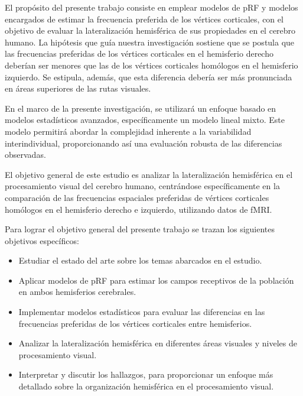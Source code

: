 El propósito del presente trabajo consiste en emplear modelos de pRF y modelos encargados de estimar la frecuencia preferida de los v\'ertices corticales, con el objetivo de evaluar la lateralización hemisférica de sus propiedades en el cerebro humano. La hipótesis que guía nuestra investigación sostiene que se postula que las frecuencias preferidas de los v\'ertices corticales en el hemisferio derecho deberían ser menores que las de los v\'ertices corticales homólogos en el hemisferio izquierdo. Se estipula, además, que esta diferencia debería ser más pronunciada en áreas superiores de las rutas  visuales.


En el marco de la presente investigación, se utilizará un enfoque basado en modelos estadísticos avanzados, específicamente un modelo lineal mixto. Este modelo permitirá abordar la complejidad inherente a la variabilidad interindividual, proporcionando así una evaluación robusta de las diferencias observadas.


El objetivo general de este estudio es analizar la lateralización hemisférica en el procesamiento visual del cerebro humano, centrándose específicamente en la comparación de las frecuencias espaciales preferidas de v\'ertices corticales hom\'ologos en el hemisferio derecho e izquierdo, utilizando datos de fMRI.

Para lograr el objetivo general del presente trabajo se
trazan los siguientes objetivos específicos:

\begin{itemize}
	\item Estudiar el estado del arte sobre los temas abarcados en el estudio.
	
	\item  Aplicar modelos de pRF para estimar los campos receptivos de la población en ambos hemisferios cerebrales.
	
	\item Implementar modelos estadísticos para evaluar las diferencias en las frecuencias preferidas de los v\'ertices corticales entre hemisferios.	
	
	\item Analizar la lateralización hemisférica en diferentes áreas visuales y niveles de procesamiento visual.
	
	\item Interpretar y discutir los hallazgos, para proporcionar un enfoque m\'as detallado sobre la organización hemisférica en el procesamiento visual.
	
		
\end{itemize}


